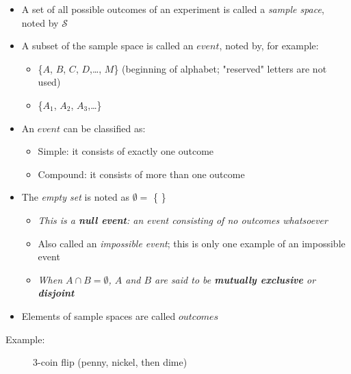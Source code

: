 \documentclass[12pt]{article}
\begin{document}
    \begin{itemize}
        \item A set of all possible outcomes of an experiment is called a \textit{sample space}, noted by $\mathcal{S}$
        \item A subset of the sample space is called an $event$, noted by, for example:
        \begin{itemize}
            \item \{$A$, $B$, $C$, $D$,\ldots, $M$\} (beginning of alphabet; "reserved" letters are not used)
            \item \{$A_1$, $A_2$, $A_3$,\ldots\}
        \end{itemize}  
        \item[] An $event$ can be classified as:
        \begin{itemize}
            \item Simple: it consists of exactly one outcome
            \item Compound: it consists of more than one outcome
        \end{itemize}
        \item The \textit{empty set} is noted as $\emptyset =$ \{ \} 
        \begin{itemize}
            \item[] \textit{This is a \textbf{null event}: an event consisting of no outcomes whatsoever}
            \item[] Also called an \textit{impossible event}; this is only one example of an impossible event
            \item[] \textit{When $A \cap B = \emptyset$, $A$ and $B$ are said to be \textbf{mutually exclusive} or \textbf{disjoint}}
        \end{itemize}
        \item Elements of sample spaces are called $outcomes$
    \end{itemize}

\begin{description}
    \item[Example:] 3-coin flip (penny, nickel, then dime)
\end{description}
\end{document}
